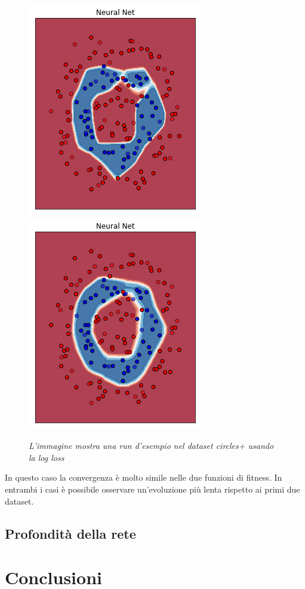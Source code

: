 \documentclass[12pt,a4paper]{report}
\begin{document}
\begin{figure}[H]
 \includegraphics[scale = 0.35]{images/circle+-rnd-log./10}
 \includegraphics[scale = 0.35]{images/circle+-rnd-log./11}
 \caption{\textit{L'immagine mostra una run d'esempio nel dataset circles+ usando la log loss}}
 \label{circles+2}
\end{figure}

In questo caso la convergenza è molto simile nelle due funzioni di fitness.
In entrambi i casi è possibile osservare un'evoluzione più lenta rispetto ai primi due dataset.

\section{Profondità della rete}

\chapter{Conclusioni}

\listoffigures

\nocite{*}


\end{document}
